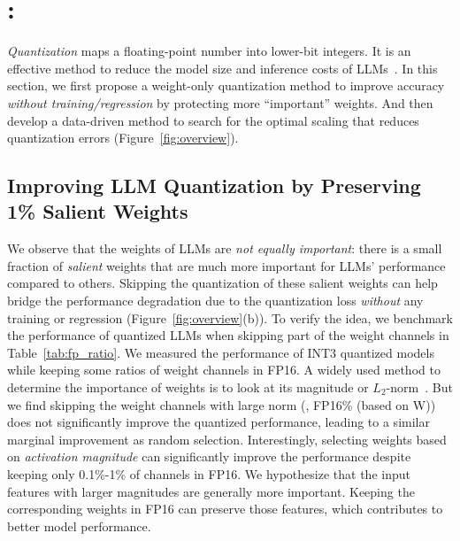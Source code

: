 









\section{\methodshort: \method}

\emph{Quantization} maps a floating-point number into lower-bit integers. It is an effective method to reduce the model size and inference costs of LLMs~\cite{dettmers2022llmint8, frantar2022gptq, zeroquant, xiao2022smoothquant}. In this section, we first propose a weight-only quantization method to improve accuracy \emph{without training/regression} by protecting more ``important'' weights. And then develop a data-driven method to search for the optimal scaling that reduces quantization errors (Figure~\ref{fig:overview}). 

\subsection{Improving LLM Quantization by Preserving 1\% Salient Weights}


We observe that the weights of LLMs are \emph{not equally important}: there is a small fraction of \emph{salient} weights that are much more important for LLMs' performance compared to others. Skipping the quantization of these salient weights can help bridge the performance degradation due to the quantization loss \emph{without} any training or regression (Figure~\ref{fig:overview}(b)).
To verify the idea, we benchmark the performance of quantized LLMs when skipping part of the weight channels in Table~\ref{tab:fp_ratio}. We measured the performance of INT3 quantized models while keeping some ratios of weight channels in FP16. A widely used method to determine the importance of weights is to look at its magnitude or $L_2$-norm~\cite{han2015learning, frankle2018lottery}. But we find skipping the weight channels with large norm (\ie, FP16\% (based on W)) does not significantly improve the quantized performance, leading to a similar marginal improvement as random selection. 
Interestingly, selecting weights based on \emph{activation magnitude} can significantly improve the performance despite keeping only 0.1\%-1\% of channels in FP16. 
We hypothesize that the input features with larger magnitudes are generally more important. Keeping the corresponding weights in FP16 can preserve those features, which contributes to better model performance. 

